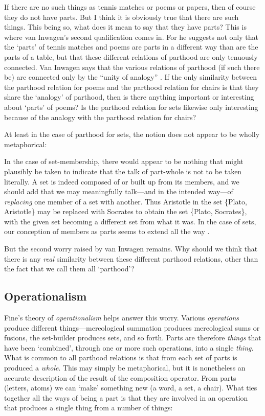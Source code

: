 \documentclass[11pt]{article}
\newenvironment{squote}{%
\begin{spacing}{1}
\begin{list}{}{%
\setlength{\labelwidth}{0pt}%
\rightmargin\leftmargin%
}
\item\relax
}{%
\end{list}%
\end{spacing}
}
\begin{document}
\begin{spacing}{1.5}
If there are no such things as tennis matches or poems or papers, then
of course they do not have parts.  But I think it is obviously true
that there are such things.  This being so, what does it mean to say
that they have parts?  This is where van Inwagen's second
qualification comes in.  For he suggests not only that the `parts' of
tennis matches and poems are parts in a different way than are the
parts of a table, but that these different relations of parthood are
only tenuously connected.  Van Inwagen says that the various relations
of parthood (if such there be) are connected only by the ``unity of
analogy'' \citeyearpar[19]{inwagen1995}.  If the only similarity
between the parthood relation for poems and the parthood relation for
chairs is that they share the `analogy' of parthood, then is there
anything important or interesting about `parts' of poems?  Is the
parthood relation for sets likewise only interesting because of the
analogy with the parthood relation for chairs?

At least in the case of parthood for sets, the notion does not appear
to be wholly metaphorical:

\begin{squote}
In the case of set-membership, there would appear to be nothing that
might plausibly be taken to indicate that the talk of part-whole is
not to be taken literally. A set is indeed composed of or built up
from its members, and we should add that we may meaningfully
talk---and in the intended way---of \emph{replacing} one member of a
set with another.  Thus Aristotle in the set \{Plato, Aristotle\} may
be replaced with Socrates to obtain the set \{Plato, Socrates\}, with
the given set becoming a different set from what it was. In the case
of sets, our conception of members as parts seems to extend all the
way \citep[564]{fine2010}.
\end{squote}

But the second worry raised by van Inwagen remains.  Why should we
think that there is any {\em real} similarity between these different
parthood relations, other than the fact that we call them all
`parthood'?

\subsection{Operationalism}
\label{operation}
Fine's theory of {\em operationalism} helps answer this worry.
Various {\em operations} produce different things---mereological
summation produces mereological sums or fusions, the set-builder
produces sets, and so forth.  Parts are therefore {\em things} that
have been `combined', through one or more such operations, into a
single {\em thing}.  What is common to all parthood relations is that
from each set of parts is produced a {\em whole}.  This may simply be
metaphorical, but it is nonetheless an accurate description of the
result of the composition operator.  From parts (letters, atoms) we
can `make' something new (a word, a set, a chair).  What ties together
all the ways of being a part is that they are involved in an operation
that produces a single thing from a number of things:


\end{spacing}
\end{document}
